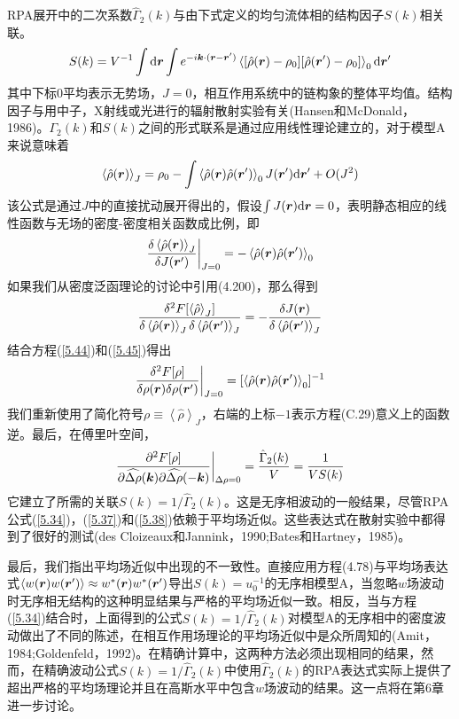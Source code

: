 RPA展开中的二次系数$\hat{\Gamma}_2(k)$与由下式定义的均匀流体相的结构因子$S(k)$相关联。
\begin{equation}
S(k)=V^{-1}\int\mathrm{d}\bm{r}\int e^{-i\bm{k}\cdot(\bm{r}-\bm{r}')}\left\langle[\hat{\rho}(\bm{r})-\rho_0][\hat{\rho}(\bm{r}')-\rho_0]\right\rangle_0\mathrm{d}\bm{r}'
\end{equation}
其中下标$0$平均表示无势场，$J=0$，相互作用系统中的链构象的整体平均值。结构因子与用中子，X射线或光进行的辐射散射实验有关(Hansen和McDonald，1986)。$\Gamma_2(k)$和$S(k)$之间的形式联系是通过应用线性理论建立的，对于模型A来说意味着
\begin{equation}
\left\langle\hat{\rho}(\bm{r})\right\rangle_J=\rho_0-\int\left\langle\hat{\rho}(\bm{r})\hat{\rho}(\bm{r}')\right\rangle_0J(\bm{r}')\mathrm{d}\bm{r}'+O(J^2)
\end{equation}
该公式是通过$J$中的直接扰动展开得出的，假设$\int J(\bm{r})\mathrm{d}\bm{r}=0$，表明静态相应的线性函数与无场的密度-密度相关函数成比例，即
\begin{equation}\label{5.44}
\frac{\delta\left\langle\hat{\rho}(\bm{r})\right\rangle_J}{\delta J(\bm{r}')}\bigg|_{J=0}=-\left\langle\hat{\rho}(\bm{r})\hat{\rho}(\bm{r}')\right\rangle_0
\end{equation}
如果我们从密度泛函理论的讨论中引用(4.200)，那么得到
\begin{equation}\label{5.45}
\frac{\delta^2F[\left\langle\hat{\rho}\right\rangle_J]}{\delta\left\langle\hat{\rho}(\bm{r})\right\rangle_J\delta\left\langle\hat{\rho}(\bm{r}')\right\rangle_J}=-\frac{\delta J(\bm{r})}{\delta\left\langle\hat{\rho}(\bm{r}')\right\rangle_J}
\end{equation}
结合方程(\ref{5.44})和(\ref{5.45})得出
\begin{equation}
\frac{\delta^2F[\rho]}{\delta\rho(\bm{r})\delta\rho(\bm{r}')}\bigg|_{J=0}=[\left\langle\hat{\rho}(\bm{r})\hat{\rho}(\bm{r}')\right\rangle_0]^{-1}
\end{equation}
我们重新使用了简化符号$\rho\equiv\left\langle\hat{\rho}\right\rangle_J$，右端的上标$-1$表示方程(C.29)意义上的函数逆。最后，在傅里叶空间，
\begin{equation}
\frac{\partial^2F[\rho]}{\partial\widehat{\Delta\rho}(\bm{k})\partial\widehat{\Delta\rho}(-\bm{k})}\bigg|_{\Delta\rho=0}=\frac{\hat{\Gamma}_2(k)}{V}=\frac{1}{VS(k)}
\end{equation}
它建立了所需的关联$S(k)=1/\hat{\Gamma}_2(k)$。这是无序相波动的一般结果，尽管RPA公式(\ref{5.34})，(\ref{5.37})和(\ref{5.38})依赖于平均场近似。这些表达式在散射实验中都得到了很好的测试(des Cloizeaux和Jannink，1990;Bates和Hartney，1985)。

最后，我们指出平均场近似中出现的不一致性。直接应用方程(4.78)与平均场表达式$\left\langle w(\bm{r})w(\bm{r}')\right\rangle\approx w^*(\bm{r})w^*(\bm{r}')$导出$S(k)=u_0^{-1}$的无序相模型A，当忽略$w$场波动时无序相无结构的这种明显结果与严格的平均场近似一致。相反，当与方程(\ref{5.34})结合时，上面得到的公式$S(k)=1/\hat{\Gamma}_2(k)$对模型A的无序相中的密度波动做出了不同的陈述，在相互作用场理论的平均场近似中是众所周知的(Amit，1984;Goldenfeld，1992)。在精确计算中，这两种方法必须出现相同的结果，然而，在精确波动公式$S(k)=1/\hat{\Gamma}_2(k)$中使用$\hat{\Gamma}_2(k)$的RPA表达式实际上提供了超出严格的平均场理论并且在高斯水平中包含$w$场波动的结果。这一点将在第6章进一步讨论。
